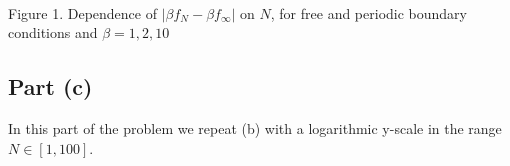 ﻿\documentclass[11pt]{article}
\begin{document}
    \begin{center}
    \end{center}
    { \hspace*{\fill} \\}
    
    Figure 1. Dependence of \(|\beta f_N - \beta f_{\infty}|\) on \(N\), for
free and periodic boundary conditions and \(\beta=1,2,10\)

    \subsection*{Part (c)}

In this part of the problem we repeat (b) with a logarithmic y-scale in
the range \(N \in [1, 100]\).
\end{document}
